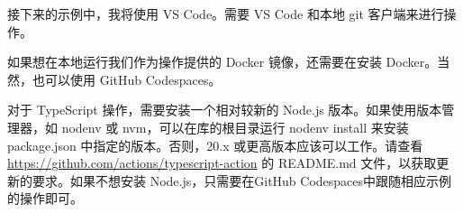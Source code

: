 
接下来的示例中，我将使用 VS Code。需要 VS Code 和本地 git 客户端来进行操作。

如果想在本地运行我们作为操作提供的 Docker 镜像，还需要在安装 Docker。当然，也可以使用 GitHub Codespaces。

对于 TypeScript 操作，需要安装一个相对较新的 Node.js 版本。如果使用版本管理器，如 nodenv 或 nvm，可以在库的根目录运行 nodenv install 来安装 package.json 中指定的版本。否则，20.x 或更高版本应该可以工作。请查看 \url{https://github.com/actions/typescript-action} 的 README.md 文件，以获取更新的要求。如果不想安装 Node.js，只需要在GitHub Codespaces中跟随相应示例的操作即可。